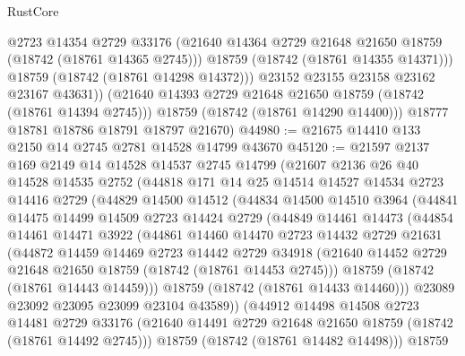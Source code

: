 \begin{lexlean}{RustCore}
\begin{coremodule}
                @2723
                @14354
                @2729
                @33176
                (@21640 @14364 @2729 @21648 @21650 @18759 (@18742 (@18761 @14365 @2745)))
                @18759
                (@18742 (@18761 @14355 @14371)))
              @18759
              (@18742 (@18761 @14298 @14372)))
            @23152
            @23155
            @23158
            @23162
            @23167
            @43631))
        (@21640 @14393 @2729 @21648 @21650 @18759 (@18742 (@18761 @14394 @2745)))
        @18759
        (@18742 (@18761 @14290 @14400)))
      @18777
      @18781
      @18786
      @18791
      @18797
      @21670)
@44980 := @21675 @14410 @133 @2150 @14 @2745 @2781 @14528 @14799 @43670
@45120 := @21597
    @2137
    @169
    @2149
    @14
    @14528
    @14537
    @2745
    @14799
    (@21607
      @2136
      @26
      @40
      @14528
      @14535
      @2752
      (@44818
        @171
        @14
        @25
        @14514
        @14527
        @14534
        @2723
        @14416
        @2729
        (@44829
          @14500
          @14512
          (@44834
            @14500
            @14510
            @3964
            (@44841
              @14475
              @14499
              @14509
              @2723
              @14424
              @2729
              (@44849
                @14461
                @14473
                (@44854
                  @14461
                  @14471
                  @3922
                  (@44861
                    @14460
                    @14470
                    @2723
                    @14432
                    @2729
                    @21631
                    (@44872
                      @14459
                      @14469
                      @2723
                      @14442
                      @2729
                      @34918
                      (@21640 @14452 @2729 @21648 @21650 @18759 (@18742 (@18761 @14453 @2745)))
                      @18759
                      (@18742 (@18761 @14443 @14459)))
                    @18759
                    (@18742 (@18761 @14433 @14460)))
                  @23089
                  @23092
                  @23095
                  @23099
                  @23104
                  @43589))
              (@44912
                @14498
                @14508
                @2723
                @14481
                @2729
                @33176
                (@21640 @14491 @2729 @21648 @21650 @18759 (@18742 (@18761 @14492 @2745)))
                @18759
                (@18742 (@18761 @14482 @14498)))
              @18759

\end{coremodule}
\end{lexlean}
